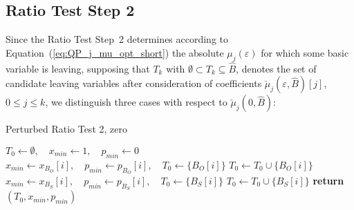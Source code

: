 \documentclass[a4paper]{article}
\begin{document}
\subsection{Ratio Test Step 2}
Since the Ratio Test Step~2 determines according to
Equation~(\ref{eq:QP_j_mu_opt_short}) the absolute
$\mu_{j}(\varepsilon)$ for which some
basic variable is leaving, supposing that $T_{k}$ with 
$\emptyset  \subset T_{k} \subseteq \hat{B}$, denotes the set 
of candidate leaving variables after consideration of coefficients
$\check{\mu}_{j}(\varepsilon, \hat{B})[j]$, 
$0 \leq j \leq k$,
we distinguish three cases with respect to
$\check{\mu}_{j}(0, \hat{B})$:
\begin{algorithm}
\caption{Perturbed Ratio Test 2, zero}
\label{alg:ratio_test_step_2_0}
\begin{algorithmic}
\State $T_{0} \gets \emptyset,
  \quad x_{min} \gets 1, \quad  p_{min} \gets 0$
            \State $x_{min} \gets x_{B_{O}}[i],
	      \quad p_{min} \gets p_{B_{O}}[i],
	      \quad T_{0} \gets \{B_{O}[i]\}$
            \State $T_{0} \gets T_{0} \cup \{B_{O}[i]\}$	 
        \EndIf
    \EndIf 
\EndFor
{}
            \State $x_{min} \gets x_{B_{S}}[i],
	      \quad p_{min} \gets p_{B_{S}}[i],
	      \quad T_{0} \gets \{B_{S}[i]\}$
            \State $T_{0} \gets T_{0} \cup \{B_{S}[i]\}$
	\EndIf	
    \EndIf 
\EndFor
\State \textbf{return} $(T_{0}, x_{min}, p_{min})$
\EndFunction
\end{algorithmic}
\end{algorithm}
\end{document}
